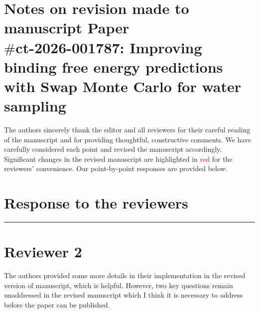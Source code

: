 \documentclass[doublespace,prb,aps]{article}
\newcounter{reviewer}
\newcounter{point}[reviewer]
\newenvironment{point1}
   {\refstepcounter{point} \bigskip \noindent {\textbf{Associate Editor Comment~}} ---\ }
   {\par }
\newcommand{\reviewersection}{\stepcounter{reviewer} \bigskip \hrule
                  \section*{Reviewer 2}}
\newenvironment{reply}
   {\medskip \noindent \color{black} \begin{sf}\textbf{Reply}:\  }
   {\medskip \par \end{sf}}
\begin{document}
\section*{Notes on revision made to manuscript Paper  \\
$\#$ct-2026-001787: Improving binding free energy predictions with Swap Monte Carlo for water sampling 
}
\vspace{10pt}

The authors sincerely thank the editor and all reviewers for their careful reading of the manuscript and for providing thoughtful, constructive comments. 
We have carefully considered each point and revised the manuscript accordingly. 
Significant changes in the revised manuscript are highlighted in \textcolor{red}{red} for the reviewers' convenience. 
Our point-by-point responses are provided below.





\section*{Response to the reviewers}




\reviewersection
The authors provided some more details in their implementation in the revised version of manuscript, which is helpful. 
However, two key questions remain unaddressed in the revised manuscript which I think it is necessary to address before the paper can be published. 
\end{document}
